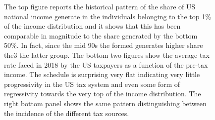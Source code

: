 \documentclass[11pt,a4paper]{article}
\begin{document}
\newpage


%
%
\begin{figure}[ht]
\centering
{}
\caption{The top figure reports the historical pattern of the share of US national income generate in the individuals belonging to the top 1\% of the income distribution and it shows that this has been comparable in magnitude to the share generated by the bottom 50\%. In fact, since the mid 90s the formed generates higher share the3 the latter group. The bottom two figures show the average tax rate faced in 2018 by the US taxpayers as a function of the pre-tax income. The schedule is surprising very flat indicating very little progressivity in the US tax system and even some form of regressivity towards the very top of the income distribution. The right bottom panel shows the same pattern distinguishing between the incidence of the different tax sources.}
\end{figure}
\end{document}
